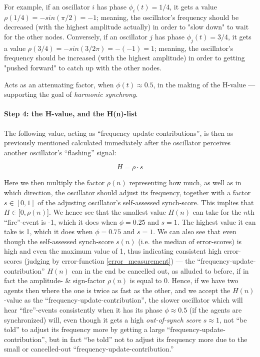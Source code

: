 		For example, if an oscillator $i$ has phase $\phi_i(t)=1/4$, it gets a value $\rho(1/4) = - sin(\pi/2) = -1$; meaning, the oscillator's frequency should be decreased (with the highest amplitude actually) in order to "slow down" to wait for the other nodes. Conversely, if an oscillator $j$ has phase $\phi_j(t)=3/4$, it gets a value $\rho(3/4) = - sin(3/2 \pi) = -(-1) = 1$; meaning, the oscillator's frequency should be increased (with the highest amplitude) in order to getting "pushed forward" to catch up with the other nodes.

		Acts as an attenuating factor, when $\phi(t)\approx0.5$, in the making of the H-value — supporting the goal of \textit{harmonic synchrony}.
		

		\paragraph{Step 4: the H-value, and the H(n)-list}
		\label{H_n}

		The following value, acting as ``frequency update contributions'', is then as previously mentioned calculated immediately after the oscillator perceives another oscillator's ``flashing'' signal:

		\begin{equation}
		\label{h_value}
			H = \rho \cdot s
		\end{equation}

		Here we then multiply the factor $\rho(n)$ representing how much, as well as in which direction, the oscillator should adjust its frequency, together with a factor $s \in [0,1]$ of the adjusting oscillator's self-assessed synch-score. This implies that $H \in [0, \rho(n)$]. We hence see that the smallest value $H(n)$ can take for the $n$th ``fire''-event is -1, which it does when $\phi = 0.25$ and $s = 1$. The highest value it can take is 1, which it does when $\phi = 0.75$ and $s = 1$. We can also see that even though the self-assessed synch-score $s(n)$ (i.e. the median of error-scores) is high and even the maximum value of 1, thus indicating consistent high error-scores (judging by error-function \eqref{error_measurement}) — the ``frequency-update-contribution'' $H(n)$ can in the end be cancelled out, as alluded to before, if in fact the amplitude- \& sign-factor $\rho(n)$ is equal to 0. Hence, if we have two agents then where the one is twice as fast as the other, and we accept the $H(n)$-value as the ``frequency-update-contribution'', the slower oscillator which will hear ``fire''-events consistently when it has its phase $\phi \approx 0.5$ (if the agents are synchronized) will, even though it gets a high \textit{out-of-synch score} $s \approx 1$, not ``be told'' to adjust its frequency more by getting a large ``frequency-update-contribution'', but in fact ``be told'' not to adjust its frequency more due to the small or cancelled-out ``frequency-update-contribution.''

